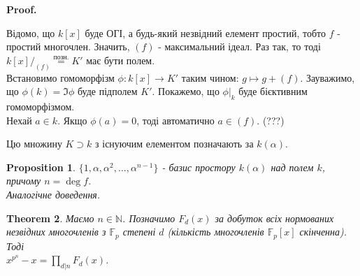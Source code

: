 \documentclass[a4paper, 14pt]{extarticle}
\makeatletter
\theoremstyle{theoremdd}
\newtheorem{theorem}{Theorem}[subsection]
\theoremstyle{theoremdd}
\theoremstyle{theoremdd}
\theoremstyle{theoremdd}
\theoremstyle{theoremdd}
\newtheorem{proposition}[theorem]{Proposition}
\theoremstyle{theoremdd}
\theoremstyle{theoremdd}
\theoremstyle{theoremdd}
\def\qed{$\blacksquare$}
\renewenvironment{proof}[1][Proof.\\]{\par
\pushQED{\hfill \qed}%
\normalfont \topsep6\p@\@plus6\p@\relax
\trivlist
\item\relax
{\bfseries
#1\@addpunct{.}}\hspace\labelsep\ignorespaces
}{%
\popQED\endtrivlist\@endpefalse
}
\makeatother
\begin{document}
\begin{proof}
Відомо, що $k[x]$ буде ОГІ, а будь-який незвідний елемент простий, тобто $f$ - простий многочлен. Значить, $(f)$ - максимальний ідеал. Раз так, то тоді $k[x]/_{(f)} \overset{\text{позн.}}{=} K'$ має бути полем.\\
Встановимо гомоморфізм $\phi: k[x] \to K'$ таким чином: $g \mapsto g + (f)$. Зауважимо, що $\phi(k) = \Im \phi$ буде підполем $K'$. Покажемо, що $\phi|_k$ буде бієктивним гомоморфізмом.\\
Нехай $a \in k$. Якщо $\phi(a) = 0$, тоді автоматично $a \in (f)$. (???)
\end{proof}

Цю множину $K \supset k$ з існуючим елементом позначають за $k(\alpha)$.

\begin{proposition}
$\{1,\alpha,\alpha^2,\dots,\alpha^{n-1}\}$ - базис простору $k(\alpha)$ над полем $k$, причому $n = \deg f$.\\
\textit{Аналогічне доведення.}
\end{proposition}

\begin{theorem}
Маємо $n \in \mathbb{N}$. Позначимо $F_d(x)$ за добуток всіх нормованих незвідних многочленів з $\mathbb{F}_p$ степені $d$ (кількість многочленів $\mathbb{F}_p[x]$ скінченна). Тоді\\
$x^{p^n} - x = \displaystyle\prod_{d | n} F_d(x)$.
\end{theorem}
\end{document}
